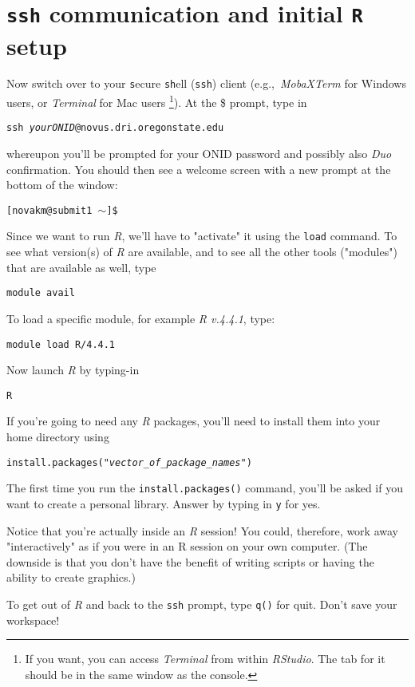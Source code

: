\documentclass[12pt,letterpaper]{article}
\begin{document}
\section{\texttt{ssh} communication and initial \texttt{R} setup}
Now switch over to your \texttt{s}ecure \texttt{sh}ell (\texttt{ssh}) client (e.g.,~\emph{MobaXTerm} for Windows users, or \emph{Terminal} for Mac users
\unskip
\footnote{If you want, you can access \emph{Terminal} from within \emph{RStudio}. 
	The tab for it should be in the same window as the console.}).
At the \$ prompt, type in

\texttt{ssh \emph{yourONID}@novus.dri.oregonstate.edu}

\noindent
whereupon you'll be prompted for your ONID password and possibly also \textit{Duo} confirmation.
You should then see a welcome screen with a new prompt at the bottom of the window:

\texttt{[novakm@submit1 $\sim$]\$}

\noindent
Since we want to run \emph{R}, we'll have to "activate" it using the \texttt{load} command.
To see what version(s) of \emph{R} are available, and to see all the other tools ("modules") that are available as well, type

\texttt{module avail}

\noindent
To load a specific module, for example \emph{R v.4.4.1}, type:

\texttt{module load R/4.4.1}

 \noindent
 Now launch \emph{R} by typing-in

 \texttt{R}

 \noindent
 If you're going to need any \emph{R} packages, you'll need to install them into your home directory using

 \texttt{install.packages("\emph{vector\_of\_package\_names}")}

 \noindent
The first time you run the \texttt{install.packages()} command, you'll be asked if you want to create a personal library.
Answer by typing in \texttt{y} for yes.

\noindent
Notice that you're actually inside an \emph{R} session! 
You could, therefore, work away "interactively" as if you were in an R session on your own computer.
(The downside is that you don't have the benefit of writing scripts or having the ability to create graphics.)

To get out of \emph{R} and back to the \texttt{ssh} prompt, type \texttt{q()} for quit.
Don't save your workspace!
\end{document}
